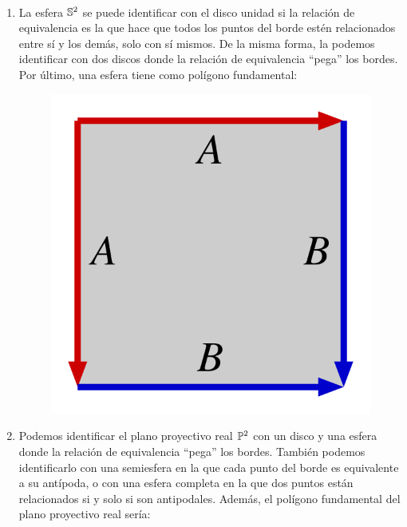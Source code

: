 \begin{exa} \
	\begin{enumerate}
		\item La esfera $\mathbb{S}^2$ se puede identificar con el disco unidad si la relación de equivalencia es la que hace que todos los puntos del borde estén relacionados entre sí y los demás, solo con sí mismos. De la misma forma, la podemos identificar con dos discos donde la relación de equivalencia ``pega'' los bordes. Por último, una esfera tiene como polígono fundamental:
		
		\begin{figure}[h!]
			\centering
			\includegraphics[scale = 0.1]{img/pol_fund_esfera}
		\end{figure}
		
		\item Podemos identificar el plano proyectivo real $\mathbb{P}^2$ con un disco y una esfera donde la relación de equivalencia ``pega'' los bordes. También podemos identificarlo con una semiesfera en la que cada punto del borde es equivalente a su antípoda, o con una esfera completa en la que dos puntos están relacionados si y solo si son antipodales. Además, el polígono fundamental del plano proyectivo real sería:
		

\end{enumerate}
\end{exa}
